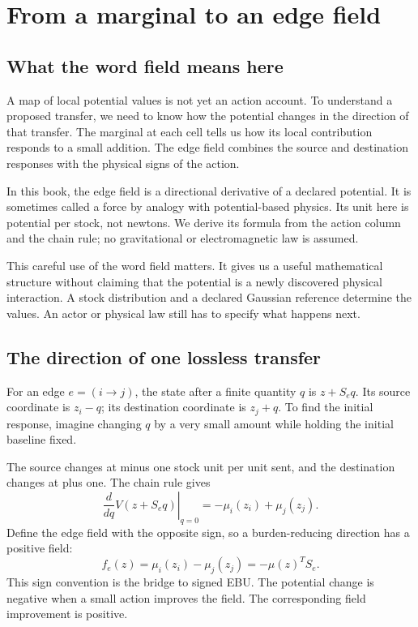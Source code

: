\chapter{From a marginal to an edge field}\label{ch:field}

\section{What the word field means here}
A map of local potential values is not yet an action account. To understand a proposed transfer, we need to know how the potential changes in the direction of that transfer. The marginal at each cell tells us how its local contribution responds to a small addition. The edge field combines the source and destination responses with the physical signs of the action.

In this book, the edge field is a directional derivative of a declared potential. It is sometimes called a force by analogy with potential-based physics. Its unit here is potential per stock, not newtons. We derive its formula from the action column and the chain rule; no gravitational or electromagnetic law is assumed.

This careful use of the word field matters. It gives us a useful mathematical structure without claiming that the potential is a newly discovered physical interaction. A stock distribution and a declared Gaussian reference determine the values. An actor or physical law still has to specify what happens next.

\section{The direction of one lossless transfer}
For an edge \(e=(i\to j)\), the state after a finite quantity \(q\) is \(z+S_e q\). Its source coordinate is \(z_i-q\); its destination coordinate is \(z_j+q\). To find the initial response, imagine changing \(q\) by a very small amount while holding the initial baseline fixed.

The source changes at minus one stock unit per unit sent, and the destination changes at plus one. The chain rule gives
\begin{equation}
 \left.\frac{d}{dq}V(z+S_e q)\right|_{q=0}
 =-\mu_i(z_i)+\mu_j(z_j).
\end{equation}
Define the edge field with the opposite sign, so a burden-reducing direction has a positive field:
\begin{equation}\label{eq:lossless-edge-field}
 f_e(z)=\mu_i(z_i)-\mu_j(z_j)=-\mu(z)^TS_e.
\end{equation}
This sign convention is the bridge to signed EBU. The potential change is negative when a small action improves the field. The corresponding field improvement is positive.


